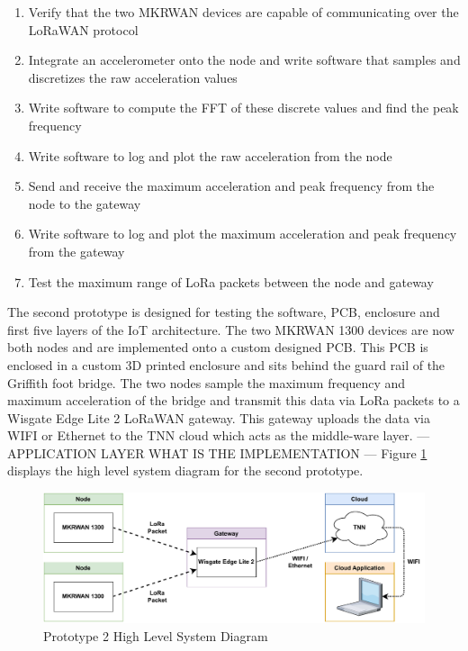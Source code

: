 \begin{enumerate}
	\item{Verify that the two MKRWAN devices are capable of communicating over the LoRaWAN protocol}
	\item{Integrate an accelerometer onto the node and write software that samples and discretizes the raw acceleration values}
	\item{Write software to compute the FFT of these discrete values and find the peak frequency}
	\item{Write software to log and plot the raw acceleration from the node}
	\item{Send and receive the maximum acceleration and peak frequency from the node to the gateway}
	\item{Write software to log and plot the maximum acceleration and peak frequency from the gateway}
	\item{Test the maximum range of LoRa packets between the node and gateway}
\end{enumerate}

The second prototype is designed for testing the software, PCB, enclosure and first five layers of the IoT architecture. The two MKRWAN 1300 devices are now both nodes and are implemented onto a custom designed PCB. This PCB is enclosed in a custom 3D printed enclosure and sits behind the guard rail of the Griffith foot bridge. The two nodes sample the maximum frequency and maximum acceleration of the bridge and transmit this data via LoRa packets to a Wisgate Edge Lite 2 LoRaWAN gateway. This gateway uploads the data via WIFI or Ethernet to the TNN cloud which acts as the middle-ware layer. --- APPLICATION LAYER WHAT IS THE IMPLEMENTATION --- Figure \ref{Proto2HLSD}
displays the high level system diagram for the second prototype. 

\begin{figure}[h] 
	\centering
	\caption{Prototype 2 High Level System Diagram}
	\label{Proto2HLSD}
	\includegraphics[scale=0.8]{Sections/Introduction/Prototype-2-High-Level.drawio.pdf}
\end{figure}


